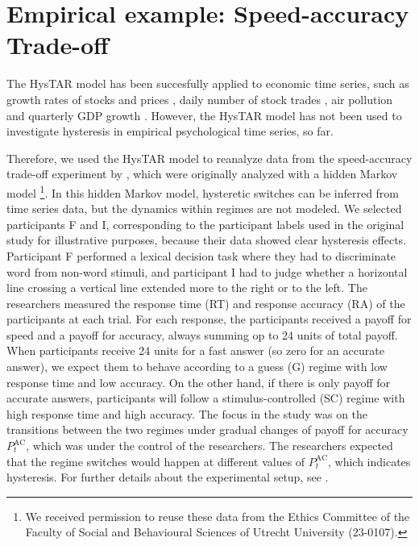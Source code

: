\documentclass{article}
\begin{document}


\section{Empirical example: Speed-accuracy Trade-off} \label{sec:empirical_example}
The HysTAR model has been succesfully applied to economic time series, such as growth rates of stocks and prices \citep{tsay}, daily number of stock trades \citep{liu}, air pollution \citep{chen} and quarterly GDP growth \citep{bar2}. However, the HysTAR model has not been used to investigate hysteresis in empirical psychological time series, so far.

Therefore, we used the HysTAR model to reanalyze data from the speed-accuracy trade-off experiment by \citet[][experiment 1b]{speedaccuracy}, which were originally analyzed with a hidden Markov model \footnote{We received permission to reuse these data from the Ethics Committee of the Faculty of Social and Behavioural Sciences of Utrecht University (23-0107).}.
In this hidden Markov model, hysteretic switches can be inferred from time series data, but the dynamics within regimes are not modeled.
We selected participants F and I, corresponding to the participant labels used in the original study for illustrative purposes, because their data showed clear hysteresis effects.
Participant F performed a lexical decision task where they had to discriminate word from non-word stimuli, and participant I had to judge whether a horizontal line crossing a vertical line extended more to the right or to the left.
The researchers measured the response time (RT) and response accuracy (RA) of the participants at each trial.
For each response, the participants received a payoff for speed and a payoff for accuracy, always summing op to 24 units of total payoff.
When participants receive 24 units for a fast answer (so zero for an accurate answer), we expect them to behave according to a guess (G) regime with low response time and low accuracy.
On the other hand, if there is only payoff for accurate answers, participants will follow a stimulus-controlled (SC) regime with high response time and high accuracy.
The focus in the study was on the transitions between the two regimes under gradual changes of payoff for accuracy $P^{\mathrm{AC}}_t$, which was under the control of the researchers.
The researchers expected that the regime switches would happen at different values of $P^{\mathrm{AC}}_t$, which indicates hysteresis.
For further details about the experimental setup, see \citet{speedaccuracy}.
\end{document}
